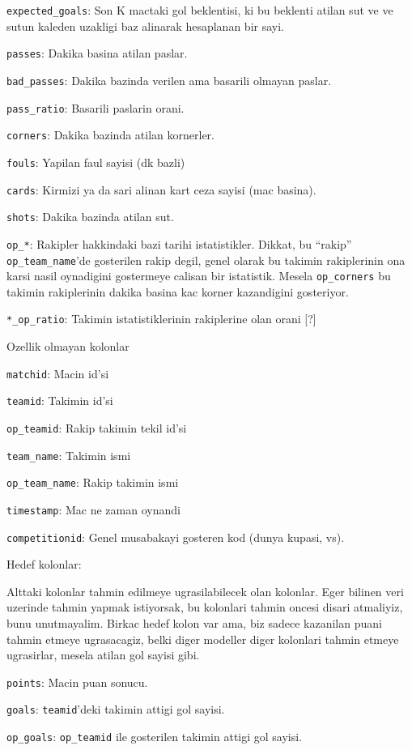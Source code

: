 \documentclass[12pt,fleqn]{article}\usepackage{../common}
\begin{document}
\verb!expected_goals!: Son K mactaki gol beklentisi, ki bu beklenti atilan
sut ve ve sutun kaleden uzakligi baz alinarak hesaplanan bir sayi.

\verb!passes!: Dakika basina atilan paslar.

\verb!bad_passes!: Dakika bazinda verilen ama basarili olmayan paslar.

\verb!pass_ratio!: Basarili paslarin orani.

\verb!corners!: Dakika bazinda atilan kornerler.

\verb!fouls!: Yapilan faul sayisi (dk bazli)

\verb!cards!: Kirmizi ya da sari alinan kart ceza sayisi (mac basina).

\verb!shots!: Dakika bazinda atilan sut.

\verb!op_*!: Rakipler hakkindaki bazi tarihi istatistikler. Dikkat, bu
``rakip'' \verb!op_team_name!'de gosterilen rakip degil, genel olarak bu
takimin rakiplerinin ona karsi nasil oynadigini gostermeye calisan bir
istatistik. Mesela \verb!op_corners! bu takimin rakiplerinin dakika basina
kac korner kazandigini gosteriyor.

\verb!*_op_ratio!: Takimin istatistiklerinin rakiplerine olan orani [?]

Ozellik olmayan kolonlar

\verb!matchid!: Macin id'si

\verb!teamid!: Takimin id'si

\verb!op_teamid!: Rakip takimin tekil id'si

\verb!team_name!: Takimin ismi

\verb!op_team_name!: Rakip takimin ismi

\verb!timestamp!: Mac ne zaman oynandi

\verb!competitionid!: Genel musabakayi gosteren kod (dunya kupasi, vs).

Hedef kolonlar:

Alttaki kolonlar tahmin edilmeye ugrasilabilecek olan kolonlar. Eger
bilinen veri uzerinde tahmin yapmak istiyorsak, bu kolonlari tahmin oncesi
disari atmaliyiz, bunu unutmayalim. Birkac hedef kolon var ama, biz
sadece kazanilan puani tahmin etmeye ugrasacagiz, belki diger modeller
diger kolonlari tahmin etmeye ugrasirlar, mesela atilan gol sayisi gibi.

\verb!points!: Macin puan sonucu.

\verb!goals!: \verb!teamid!'deki takimin attigi gol sayisi.

\verb!op_goals!: \verb!op_teamid! ile gosterilen takimin attigi gol sayisi.
\end{document}
